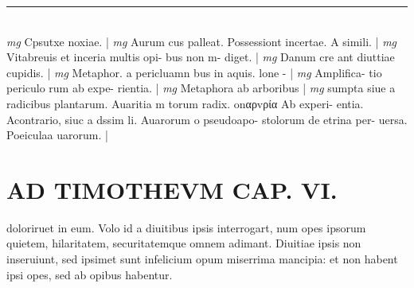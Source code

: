 \documentclass{article}
\begin{document}
\begin{pages}
\vspace{0.2cm}\rule{1cm}{0.2pt}\\ 
\hspace{0.2cm}\textit{mg}
\footnotesize Cpsutxe noxiae. 
\normalsize| 
\hspace{0.2cm}\textit{mg}
\footnotesize Aurum cus palleat. Possessiont incertae. A simili. 
\normalsize| 
\hspace{0.2cm}\textit{mg}
\footnotesize Vitabreuis et inceria multis opi- bus non m- diget. 
\normalsize| 
\hspace{0.2cm}\textit{mg}
\footnotesize Danum cre ant diuttiae cupidis. 
\normalsize| 
\hspace{0.2cm}\textit{mg}
\footnotesize Metaphor. a pericluamn bus in aquis. lone - 
\normalsize| 
\hspace{0.2cm}\textit{mg}
\footnotesize Amplifica- tio periculo rum ab expe- rientia. 
\normalsize| 
\hspace{0.2cm}\textit{mg}
\footnotesize Metaphora ab arboribus  
\normalsize| 
\hspace{0.2cm}\textit{mg}
\footnotesize sumpta siue a radicibus plantarum. Auaritia m torum radix. onαρvρία Ab experi- entia. Acontrario, siuc a dssim li. Auarorum o pseudoapo- stolorum de etrina per- uersa. Poeiculaa uarorum. 
\normalsize| 
\section*{AD TIMOTHEVM CAP. VI. }
\marginpar{[ p.127 ]}\pstart doloriruet in eum. Volo id a diuitibus ipsis interrogart, num opes ipsorum quietem, hilaritatem, securitatemque omnem adimant. Diuitiae ipsis non inseruiunt, sed ipsimet sunt infelicium opum miserrima mancipia: et non habent ipsi opes, sed ab opibus habentur.  \pend
{}
{}

\end{pages}
\end{document}
